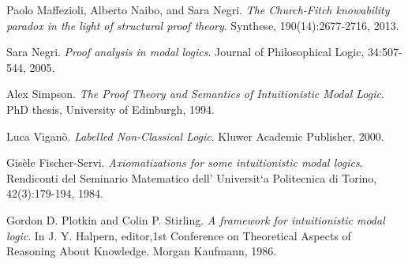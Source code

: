 \documentclass[twoside]{aiml18}
\begin{document}
\begin{thebibliography}{4}
	Paolo Maffezioli, Alberto Naibo, and Sara Negri. \emph{The Church-Fitch knowability paradox in the light of structural proof theory}. Synthese, 190(14):2677-2716, 2013. 
	
	
	Sara Negri. \emph{Proof analysis in modal logics}. Journal of Philosophical Logic, 34:507-544, 2005. 
	
	Alex Simpson. \emph{The Proof Theory and Semantics of Intuitionistic Modal Logic}. PhD thesis, University of Edinburgh, 1994. 
	
	Luca Vigan\`o. \emph{Labelled Non-Classical Logic}. Kluwer Academic Publisher, 2000. 
	
	
	Gis\`ele Fischer-Servi.\emph{ Axiomatizations for some intuitionistic modal logics}. Rendiconti del Seminario Matematico dell’ Universit`a Politecnica di Torino, 42(3):179-194, 1984.
	
	Gordon D. Plotkin and Colin P. Stirling. \emph{A framework for intuitionistic modal logic}. In J. Y. Halpern, editor,1st Conference on Theoretical Aspects of Reasoning About Knowledge.
	Morgan Kaufmann, 1986.
	
	
	
\end{thebibliography}
\end{document}
